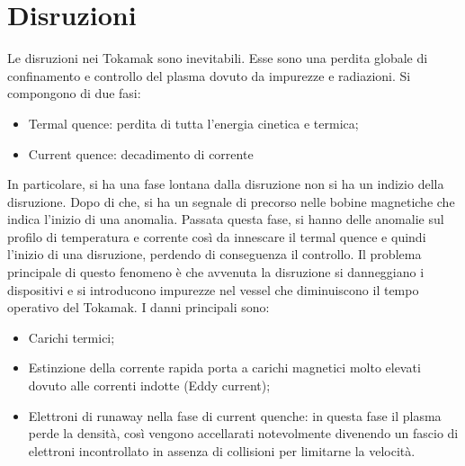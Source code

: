 \documentclass{article}
\begin{document}
\section{Disruzioni}
Le disruzioni nei Tokamak sono inevitabili. Esse sono una perdita globale di confinamento e controllo del plasma dovuto da impurezze e radiazioni.\newline
Si compongono di due fasi:
\begin{itemize}
    \item Termal quence: perdita di tutta l'energia cinetica e termica;
    \item Current quence: decadimento di corrente
\end{itemize}
In particolare, si ha una fase lontana dalla disruzione non si ha un indizio della disruzione. Dopo di che, si ha un segnale di precorso nelle bobine magnetiche che indica l'inizio di una anomalia. Passata questa fase, si hanno delle anomalie sul profilo di temperatura e corrente così da innescare il termal quence e quindi l'inizio di una disruzione, perdendo di conseguenza il controllo.\newline
Il problema principale di questo fenomeno è che avvenuta la disruzione si danneggiano i dispositivi e si introducono impurezze nel vessel che diminuiscono il tempo operativo del Tokamak. I danni principali sono:
\begin{itemize}
    \item Carichi termici;
    \item Estinzione della corrente rapida porta a carichi magnetici molto elevati dovuto alle correnti indotte (Eddy current);
    \item Elettroni di runaway nella fase di current quenche: in questa fase il plasma perde la densità, così vengono accellarati notevolmente divenendo un fascio di elettroni incontrollato in assenza di collisioni per limitarne la velocità.
\end{itemize}
\end{document}

